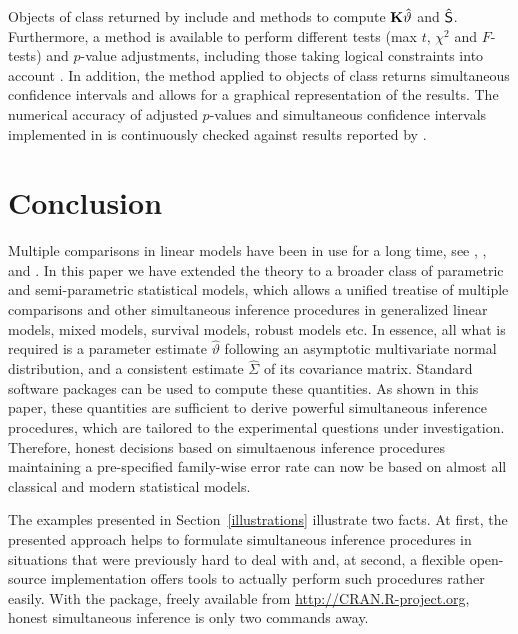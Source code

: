 \documentclass[12pt]{article}
\begin{document}
Objects of class  returned by  include %
 and  methods to compute $\mathbf{K} \hat{\vartheta}$ and $%
\hat{\S }$. Furthermore, a  method is available to perform
different tests (max $t$, $\chi^2$ and $F$-tests) and $p$-value adjustments,
including those taking logical constraints into account \citep{Shaffer1986,
Westfall1997}. In addition, the  method applied to objects
of class  returns simultaneous confidence intervals and allows
for a graphical representation of the results. The numerical accuracy of
adjusted $p$-values and simultaneous confidence intervals implemented in %
 is continuously checked against results reported by \cite%
{Westfall1999}.





\section{Conclusion}

Multiple comparisons in linear models have been in use for a long time, see 
\cite{HochbergTamhane1987}, \cite{Hsu1996}, and \cite{Bretzetal2008}. In
this paper we have extended the theory to a broader class of parametric and
semi-parametric statistical models, which allows a unified treatise of
multiple comparisons and other simultaneous inference procedures in
generalized linear models, mixed models, survival models, robust models etc.
In essence, all what is required is a parameter estimate $\hat{\vartheta}$
following an asymptotic multivariate normal distribution, and a consistent
estimate $\hat{\Sigma}$ of its covariance matrix. Standard software packages
can be used to compute these quantities. As shown in this paper, these
quantities are sufficient to derive powerful simultaneous inference
procedures, which are tailored to the experimental questions under
investigation. Therefore, honest decisions based on simultaenous inference
procedures maintaining a pre-specified family-wise error rate can now be
based on almost all classical and modern statistical models.

The examples presented in Section~\ref{illustrations} illustrate two facts.
At first, the presented approach helps to formulate simultaneous inference
procedures in situations that were previously hard to deal with and, at
second, a flexible open-source implementation offers tools to actually
perform such procedures rather easily. With the  package,
freely available from \url{http://CRAN.R-project.org}, honest simultaneous
inference is only two commands away. 



\end{document}
